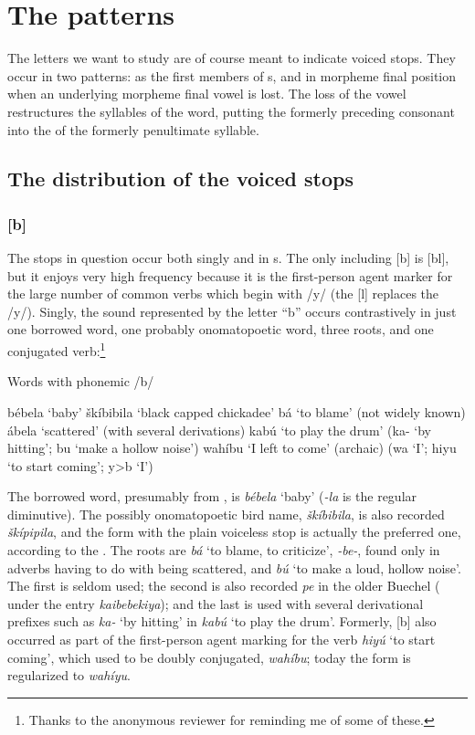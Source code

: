 \documentclass[output=paper]{LSP/langsci}
\begin{document}
\section{The patterns}

The letters we want to study are of course meant to indicate voiced stops. They occur in two patterns: as the first members of s, and in morpheme final position when an underlying morpheme final vowel is lost. The loss of the vowel restructures the syllables of the word, putting the formerly preceding consonant into the  of the formerly penultimate syllable.

\subsection{The distribution of the voiced stops}

\subsubsection{[b]}

The stops in question occur both singly and in s. The only  including [b] is [bl], but it enjoys very high frequency because it is the first-person agent marker for the large number of common verbs which begin with /y/ (the [l] replaces the /y/). Singly, the sound represented by the letter ``b'' occurs contrastively in just one borrowed word, one probably onomatopoetic word, three roots, and one conjugated verb:\footnote{Thanks to the anonymous reviewer for reminding me of some of these.}

\begin{exe} \label{ex:rood:1}
\ex Words with phonemic /b/
\begin{xlist}
\ex b\'ebela `baby'
\ex \v{s}k\'ibibila `black capped chickadee'
\ex b\'a `to blame' (not widely known)
\ex \'abela `scattered' (with several derivations)
\ex kab\'u `to play the drum' (ka- `by hitting'; bu `make a hollow noise')
\ex wah\'ibu `I left to come' (archaic) (wa `I'; hiyu `to start coming'; y>b `I')
\end{xlist}
\end{exe} 

The borrowed word, presumably from , is \textit{b\'ebela} `baby' (\textit{-la} is the regular  diminutive). The possibly onomatopoetic bird name, \textit{\v{s}k\'ibibila}, is also recorded \textit{\v{s}k\'ipipila}, and the form with the plain voiceless stop is actually the preferred one, according to the . The roots are \textit{b\'a} `to blame, to criticize', \textit{-be-}, found only in adverbs having to do with being scattered, and \textit{b\'u} `to make a loud, hollow noise'. The first is seldom used; the second is also recorded \textit{pe} in the older Buechel  (\citealt[278]{Buechel1970} under the entry \textit{kaibebekiya}); and the last is used with several derivational prefixes such as \textit{ka-} `by hitting' in \textit{kab\'u} `to play the drum'. Formerly, [b] also occurred as part of the first-person agent marking for the verb \textit{hiy\'u} `to start coming', which used to be doubly conjugated, \textit{wah\'ibu}; today the form is regularized to \textit{wah\'iyu}.
\end{document}
